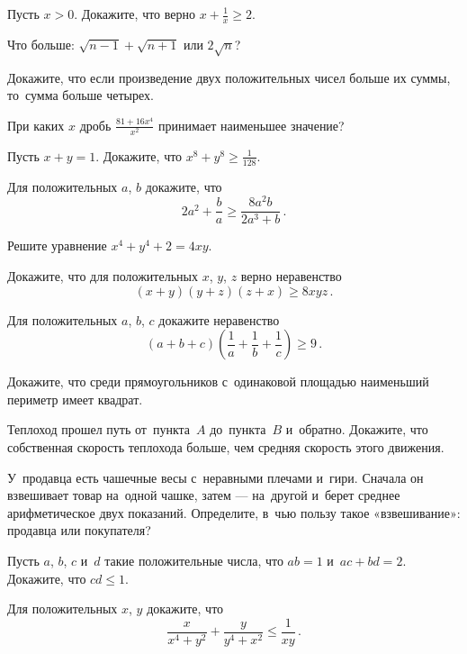 



\begin{problems}

\item
Пусть $x > 0$.
Докажите, что верно $x + \frac{1}{x} \geq 2$.

\item
Что больше: $\sqrt{n - 1} + \sqrt{n + 1}$ или $2 \sqrt{n}$?

\item
Докажите, что если произведение двух положительных чисел больше их суммы,
то~сумма больше четырех.

\item
При каких $x$ дробь $\frac{81 + 16x^4}{x^2}$ принимает наименьшее значение?

\item
Пусть $x + y = 1$.
Докажите, что $x^8 + y^8 \geq \frac{1}{128}$.

\item
Для положительных $a$, $b$ докажите, что
\[
    2 a^2 + \frac{b}{a} \geq \frac{8 a^2 b}{2 a^3 + b}
\, . \]

\item
Решите уравнение $x^4 + y^4 + 2 = 4 x y$.

\item
Докажите, что для положительных $x$, $y$, $z$ верно неравенство
\[
    (x + y) (y + z) (z + x) \geq 8 x y z
\, . \]

\item
Для положительных $a$, $b$, $c$ докажите неравенство
\[
    (a + b + c)
    \left(
        \frac{1}{a} + \frac{1}{b} + \frac{1}{c}
    \right)
\geq
    9
\, . \]

\item
Докажите, что среди прямоугольников с~одинаковой площадью наименьший периметр
имеет квадрат.

\item
Теплоход прошел путь от~пункта~$A$ до~пункта~$B$ и~обратно.
Докажите, что собственная скорость теплохода больше, чем средняя скорость этого
движения.

\item
У~продавца есть чашечные весы с~неравными плечами и~гири.
Сначала он взвешивает товар на~одной чашке, затем — на~другой и~берет среднее
арифметическое двух показаний.
Определите, в~чью пользу такое «взвешивание»: продавца или покупателя?

\item
Пусть $a$, $b$, $c$ и~$d$ такие положительные числа, что $a b = 1$ и~$a c + b d = 2$.
Докажите, что $c d \leq 1$.

\item
Для положительных $x$, $y$ докажите, что
\[
    \frac{x}{x^4 + y^2} + \frac{y}{y^4 + x^2}
\leq
    \frac{1}{x y}
\, . \]


\end{problems}

